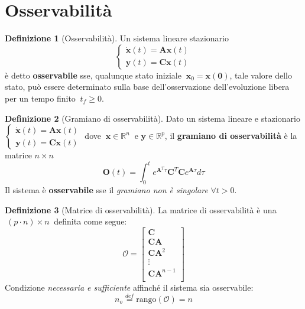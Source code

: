 \documentclass[a4paper]{article}
\newcommand{\numberset}{\mathbb}
\newcommand{\R}{\numberset{R}}
\renewcommand{\vec}{\bm}
\theoremstyle{definition}
\newtheorem{defn}{Definizione}[subsection]
\begin{document}
			\newpage
			
	\section{Osservabilità}
		\begin{defn}[Osservabilità]
			Un sistema lineare stazionario
			\[
				\begin{cases}
					\dot{\vec{x}}(t) = \vec{A}\vec{x}(t) \\
					\vec{y}(t) = \vec{C}\vec{x}(t)
				\end{cases}
			\]
			è detto \textbf{osservabile} sse, qualunque stato iniziale $ \ \vec{x}_0 = \vec{x}(\vec{0}) $, tale valore dello stato, può essere determinato sulla base dell'osservazione dell'evoluzione libera per un tempo finito $ \ t_f\geq 0 $.
		\end{defn}
		
		\begin{defn}[Gramiano di osservabilità]
			Dato un sistema lineare e stazionario $ \begin{cases}
				\dot{\vec{x}}(t) = \vec{A}\vec{x}(t) \\
				\vec{y}(t) = \vec{C}\vec{x}(t)
			\end{cases} $
			 dove $\ \vec{x} \in \R^n \ $ e $ \vec{y} \in \R^p $, il \textbf{gramiano di osservabilità} è la matrice $ n\times n $
			 \[
				 \vec{O}(t) = \int_0^t e^{\vec{A}^T\tau}\vec{C}^T\vec{C}e^{\vec{A}\tau}d\tau
			 \]
			 Il sistema è \textbf{osservabile} sse il \textit{gramiano non è singolare} $ \forall t > 0 $.
		\end{defn}
		
		\begin{defn}[Matrice di osservabilità]
			La matrice di osservabilità è una $\ (p\cdot n)\times n\  $ definita come segue:
			\[
				\mathcal{O} =
				\begin{bmatrix}
					\vec{C} \\\vec{C}\vec{A} \\ \vec{C}\vec{A}^2 \\ \vdots \\ \vec{C}\vec{A}^{n-1} \\
				\end{bmatrix}
			\]
			Condizione \textit{necessaria e sufficiente} affinché il sistema sia osservabile:
			\[
				n_o \stackrel{def}{=} \text{rango}(\mathcal{O}) = n
			\]
		\end{defn}
		
\end{document}
